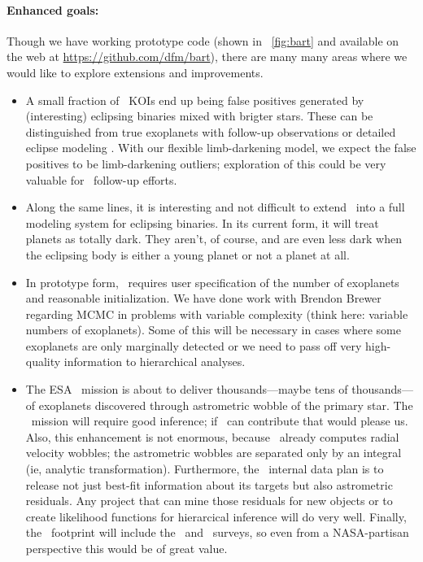 \documentclass[letterpaper,12pt,preprint]{hack_aastex}
\newcommand{\hurl}[1]{{\scriptsize\url{#1}}}
\newcommand{\Bart}{\package{Bart}}
\begin{document}
\paragraph{Enhanced goals:}
Though we have working prototype code (shown in
\figurename~\ref{fig:bart} and available on the web at
\hurl{https://github.com/dfm/bart}), there are many many areas where we
would like to explore extensions and improvements.
\begin{itemize}
\item
A small fraction of \Kepler\ KOIs end up being false positives
generated by (interesting) eclipsing binaries mixed with brigter stars.
These can be distinguished from true exoplanets
with follow-up observations \citep[for example,][]{kepler4} or detailed
eclipse modeling \citep{blender}.  With our flexible limb-darkening
model, we expect the false positives to be limb-darkening outliers;
exploration of this could be very valuable for \Kepler\ follow-up
efforts.
\item
Along the same lines, it is interesting and not difficult to extend
\Bart\ into a full modeling system for eclipsing binaries.  In its
current form, it will treat planets as totally dark.  They aren't, of
course, and are even less dark when the eclipsing body is either a
young planet or not a planet at all.
\item
In prototype form, \Bart\ requires user specification of the number of
exoplanets and reasonable initialization.  We have done work with
Brendon Brewer \citep{brewer} regarding MCMC in problems with variable
complexity (think here: variable numbers of exoplanets).  Some of this
will be necessary in cases where some exoplanets are only marginally
detected or we need to pass off very high-quality information to
hierarchical analyses.
\item
The ESA \Gaia\ mission is about to deliver
thousands---maybe tens of thousands---of exoplanets discovered through
astrometric wobble of the primary star.  The \Gaia\ mission will
require good inference; if \Bart\ can contribute that would please us.
Also, this enhancement is not enormous, because \Bart\ already
computes radial velocity wobbles; the astrometric wobbles are
separated only by an integral (ie, analytic transformation).
Furthermore, the \Gaia\ internal data plan is to release not just
best-fit information about its targets but also astrometric residuals.
Any project that can mine those residuals for new objects or to create
likelihood functions for hierarcical inference will do very well.
Finally, the \Gaia\ footprint will include the \Kepler\ and
\TESS\ surveys, so even from a NASA-partisan perspective this would be
of great value.
\end{itemize}
\end{document}
